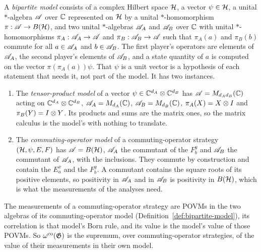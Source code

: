 \begin{definition}
\label{def:bipartite-model}
\leanok
A \emph{bipartite model} consists of a complex Hilbert space $\mathcal{H}$, a vector $\psi \in \mathcal{H}$, a
unital $*$-algebra $\mathscr{A}$ over $\mathbb{C}$ represented on $\mathcal{H}$ by a unital $*$-homomorphism
$\pi : \mathscr{A} \to B(\mathcal{H})$, and two unital $*$-algebras $\mathscr{A}_A$ and $\mathscr{A}_B$ over $\mathbb{C}$ with unital
$*$-homomorphisms $\pi_A : \mathscr{A}_A \to \mathscr{A}$ and $\pi_B : \mathscr{A}_B \to \mathscr{A}$ such that $\pi_A(a)$
and $\pi_B(b)$ commute for all $a \in \mathscr{A}_A$ and $b \in \mathscr{A}_B$. The first player's operators
are elements of $\mathscr{A}_A$, the second player's elements of $\mathscr{A}_B$, and a state quantity of $a$
is computed on the vector $\pi(\pi_A(a))\psi$. That $\psi$ is a unit vector is a hypothesis of
each statement that needs it, not part of the model. It has two instances.
\begin{enumerate}
  \item The \emph{tensor-product model} of a vector $\psi \in \mathbb{C}^{d_A} \otimes \mathbb{C}^{d_B}$ has
    $\mathscr{A} = M_{d_A d_B}(\mathbb{C})$ acting on $\mathbb{C}^{d_A} \otimes \mathbb{C}^{d_B}$, $\mathscr{A}_A = M_{d_A}(\mathbb{C})$,
    $\mathscr{A}_B = M_{d_B}(\mathbb{C})$, $\pi_A(X) = X \otimes I$ and $\pi_B(Y) = I \otimes Y$. Its
    products and sums are the matrix ones, so the matrix calculus is the model's with nothing to
    translate.
  \item The \emph{commuting-operator model} of a commuting-operator strategy
    $(\mathcal{H}, \psi, E, F)$ has $\mathscr{A} = B(\mathcal{H})$, $\mathscr{A}_A$ the commutant of the $F^y_b$ and $\mathscr{A}_B$
    the commutant of $\mathscr{A}_A$, with the inclusions. They commute by construction and contain the
    $E^x_a$ and the $F^y_b$. A commutant contains the square roots of its positive elements, so
    positivity in $\mathscr{A}_A$ and in $\mathscr{A}_B$ is positivity in $B(\mathcal{H})$, which is what the
    measurements of the analyses need.
\end{enumerate}
\end{definition}

\begin{lemma}
\label{lem:co-value-model}
\leanok
The measurements of a commuting-operator strategy are POVMs in the two algebras of its
commuting-operator model (Definition~\ref{def:bipartite-model}), its correlation is that model's
Born rule, and its value is the model's value of those POVMs. So $\omega^{\mathrm{co}}(\mathfrak{G})$ is the
supremum, over commuting-operator strategies, of the value of their measurements in their own
model.
\end{lemma}

